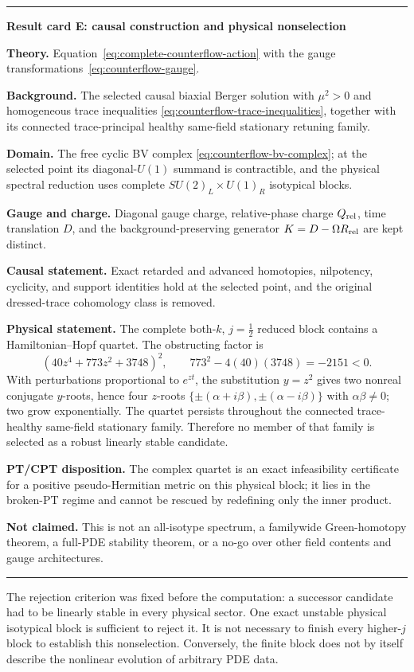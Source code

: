 \documentclass[11pt]{article}
\newenvironment{resultcard}[1]
 {\par\medskip\noindent\hrule\smallskip\noindent\textbf{#1}\par\smallskip}
 {\par\smallskip\hrule\medskip}
\begin{document}
\begin{resultcard}{Result card E: causal construction and physical nonselection}
\textbf{Theory.} Equation~\eqref{eq:complete-counterflow-action} with the
gauge transformations~\eqref{eq:counterflow-gauge}.\par
\textbf{Background.} The selected causal biaxial Berger solution with
$\mu^2>0$ and homogeneous trace inequalities
\eqref{eq:counterflow-trace-inequalities}, together with its connected
trace-principal healthy same-field stationary retuning family.\par
\textbf{Domain.} The free cyclic BV complex
\eqref{eq:counterflow-bv-complex}; at the selected point its diagonal-$U(1)$
summand is contractible, and the physical spectral reduction uses complete
$SU(2)_L\times U(1)_R$ isotypical blocks.\par
\textbf{Gauge and charge.} Diagonal gauge charge, relative-phase charge
$Q_{\rm rel}$, time translation $D$, and the background-preserving generator
$K=D-\Omega R_{\rm rel}$ are kept distinct.\par
\textbf{Causal statement.} Exact retarded and advanced homotopies, nilpotency,
cyclicity, and support identities hold at the selected point, and the original
dressed-trace cohomology class is removed.\par
\textbf{Physical statement.} The complete both-$k$, $j=\tfrac12$ reduced
block contains a Hamiltonian--Hopf quartet.  The obstructing factor is
\[
 (40z^4+773z^2+3748)^2,
 \qquad 773^2-4(40)(3748)=-2151<0.
\]
With perturbations proportional to $e^{zt}$, the substitution $y=z^2$ gives
two nonreal conjugate $y$-roots, hence four $z$-roots
$\{\pm(\alpha+i\beta),\pm(\alpha-i\beta)\}$ with
$\alpha\beta\ne0$; two grow exponentially.  The quartet persists throughout
the connected trace-healthy same-field stationary family.  Therefore no
member of that family is selected as a robust linearly stable candidate.\par
\textbf{PT/CPT disposition.} The complex quartet is an exact infeasibility
certificate for a positive pseudo-Hermitian metric on this physical block;
it lies in the broken-PT regime and cannot be rescued by redefining only the
inner product.\par
\textbf{Not claimed.} This is not an all-isotype spectrum, a familywide
Green-homotopy theorem, a full-PDE stability theorem, or a no-go over other
field contents and gauge architectures.
\end{resultcard}

The rejection criterion was fixed before the computation: a successor
candidate had to be linearly stable in every physical sector.  One exact
unstable physical isotypical block is sufficient to reject it.  It is not
necessary to finish every higher-$j$ block to establish this nonselection.
Conversely, the finite block does not by itself describe the nonlinear
evolution of arbitrary PDE data.
\end{document}
